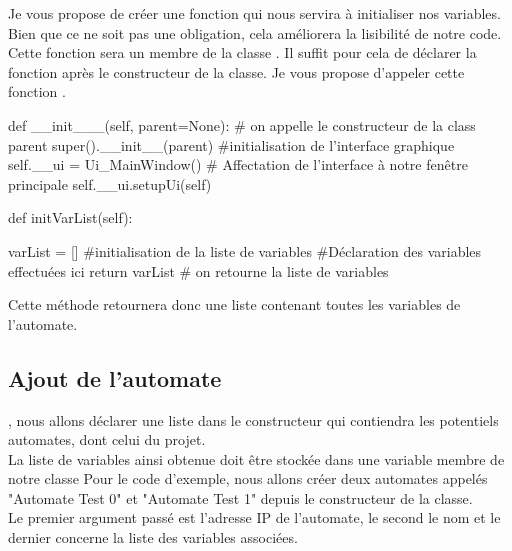 \documentclass[12pt]{report}    %
\begin{document}
Je vous propose de créer une fonction qui nous servira à initialiser nos variables. Bien que ce ne soit pas une obligation, cela améliorera la lisibilité de notre code.\newline
Cette fonction sera un membre de la classe .\newline
Il suffit pour cela de déclarer la fonction après le constructeur de la classe.\newline
Je vous propose d'appeler cette fonction .\smallSkip

\begin{pyCode}

    def __init___(self, parent=None):
        # on appelle le constructeur de la class parent
        super().__init__(parent)
        #initialisation de l’interface graphique
        self.__ui = Ui_MainWindow()
        # Affectation de l’interface à notre fenêtre principale
        self.__ui.setupUi(self)    

    def initVarList(self):

        varList = []  #initialisation de la liste de variables
        #Déclaration des variables effectuées ici
        return varList  # on retourne la liste de variables

\end{pyCode}

Cette méthode retournera donc une liste contenant toutes les variables de l'automate.\\


\subsection{Ajout de l'automate}

, nous allons déclarer une liste dans le constructeur qui contiendra les potentiels automates, dont celui du projet. \\
La liste de variables ainsi obtenue doit être stockée dans une variable membre de notre classe \smallSkip
Pour le code d'exemple, nous allons créer deux automates appelés "Automate Test 0" et "Automate Test 1" depuis le constructeur de la classe.\\

Le premier argument passé est l'adresse IP de l'automate, le second le nom et le dernier concerne la liste des variables associées.
\end{document}

